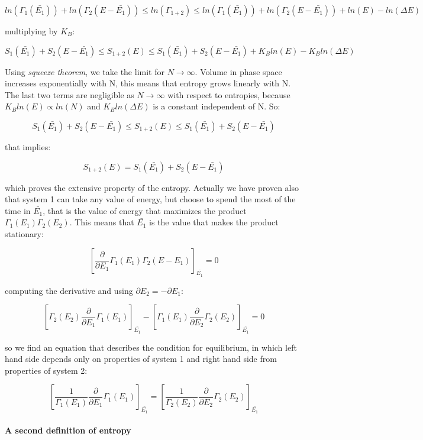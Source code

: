 \documentclass[a4paper, italian, openany]{book}
\begin{document}
$$ln(\Gamma_1(\bar{E_1})) + ln(\Gamma_2(E- \bar{E_1})) \le ln(\Gamma_{1+2}) \le ln(\Gamma_1(\bar{E_1})) + ln(\Gamma_2(E-\bar{E_1})) + ln(E) - ln(\Delta E)$$

multiplying by $K_B$:

$$S_1(\bar{E_1}) + S_2(E-\bar{E_1}) \le S_{1+2}(E) \le S_1(\bar{E_1}) + S_2(E-\bar{E_1}) + K_B ln(E) - K_B ln(\Delta E)$$

Using \textit{squeeze theorem}, we take the limit for $N \to \infty$. Volume in phase space increases exponentially with N, this means that entropy grows linearly with N. The last two terms are negligible as $N \to \infty$ with respect to entropies, because $K_B ln(E) \propto ln(N)$ and $K_B ln(\Delta E)$ is a constant independent of N. So:

$$S_1(\bar{E_1}) + S_2(E-\bar{E_1}) \le S_{1+2}(E) \le S_1(\bar{E_1}) + S_2(E-\bar{E_1})$$

that implies:

$$S_{1+2}(E) = S_1(\bar{E_1}) + S_2(E- \bar{E_1})$$

which proves the extensive property of the entropy. Actually we have proven also that system 1 can take any value of energy, but choose to spend the most of the time in $\bar{E_1}$, that is the value of energy that maximizes the product $\Gamma_1(E_1)\Gamma_2(E_2)$.\newline
This means that $\bar{E_1}$ is the value that makes the product stationary:

$$\left [ \frac{\partial}{\partial E_1} \Gamma_1(E_1)\Gamma_2(E-E_1) \right ]_{\bar{E_1}}= 0$$

computing the derivative and using $\partial E_2 = - \partial E_1$:

$$\left [ \Gamma_2(E_2) \frac{\partial}{\partial E_1} \Gamma_1(E_1) \right ]_{\bar{E_1}} - \left [ \Gamma_1 (E_1) \frac{\partial}{\partial E_2} \Gamma_2(E_2) \right ]_{\bar{E_1}} = 0$$

so we find an equation that describes the condition for equilibrium, in which left hand side depends only on properties of system 1 and right hand side from properties of system 2:

$$\left [ \frac{1}{\Gamma_1(E_1)} \frac{\partial}{\partial E_1} \Gamma_1(E_1) \right ]_{\bar{E_1}} = \left [ \frac{1}{\Gamma_2 (E_2)} \frac{\partial}{\partial E_2} \Gamma_2(E_2) \right ]_{\bar{E_1}}$$

\paragraph{A second definition of entropy}
\end{document}
